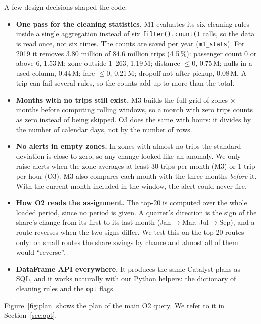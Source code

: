 \documentclass[sigconf]{acmart}
\begin{document}
A few design decisions shaped the code:
\begin{itemize}
  \item \textbf{One pass for the cleaning statistics.} M1 evaluates its six cleaning rules inside a single
    aggregation instead of six \texttt{filter().count()} calls, so the data is read once, not six times. The
    counts are saved per year (\texttt{m1\_stats}). For 2019 it removes 3.80 million of 84.6 million trips
    (4.5\,\%): passenger count 0 or above 6, 1.53\,M; zone outside 1--263, 1.19\,M; distance $\le 0$, 0.75\,M;
    nulls in a used column, 0.44\,M; fare $\le 0$, 0.21\,M; dropoff not after pickup, 0.08\,M. A trip can fail
    several rules, so the counts add up to more than the total.
  \item \textbf{Months with no trips still exist.} M3 builds the full grid of zones $\times$ months before computing
    rolling windows, so a month with zero trips counts as zero instead of being skipped. O3 does the same with
    hours: it divides by the number of calendar days, not by the number of rows.
  \item \textbf{No alerts in empty zones.} In zones with almost no trips the standard deviation is close to zero,
    so any change looked like an anomaly. We only raise alerts when the zone averages at least 30 trips per month
    (M3) or 1 trip per hour (O3). M3 also compares each month with the three months \emph{before} it. With the
    current month included in the window, the alert could never fire.
  \item \textbf{How O2 reads the assignment.} The top-20 is computed over the whole loaded period, since no period is
    given. A quarter's direction is the sign of the share's change from its first to its last month (Jan$\to$Mar,
    Jul$\to$Sep), and a route reverses when the two signs differ. We test this on the top-20 routes only: on small
    routes the share swings by chance and almost all of them would ``reverse''.
  \item \textbf{DataFrame API everywhere.} It produces the same Catalyst plans as SQL, and it works naturally with
    our Python helpers: the dictionary of cleaning rules and the \texttt{opt} flags.
\end{itemize}

Figure~\ref{fig:plan} shows the plan of the main O2 query. We refer to it in Section~\ref{sec:opt}.
\end{document}
